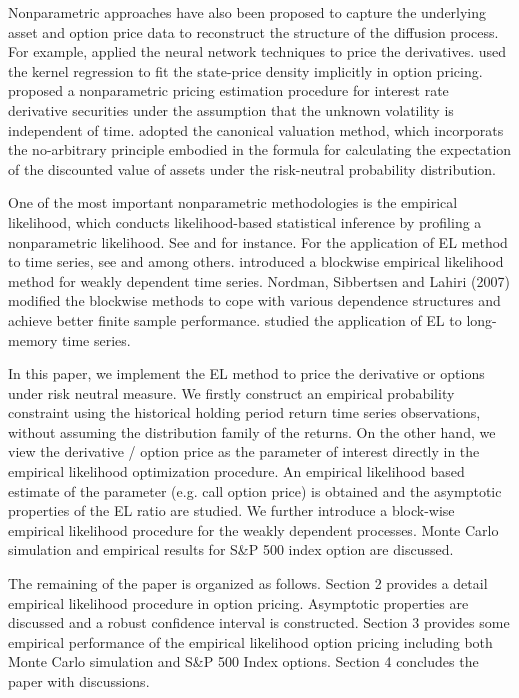 Nonparametric approaches have also been proposed to capture the underlying
asset and option price data to reconstruct the structure of the diffusion
process. For example, \citet{hutchinson1994nonparametric} applied the
neural network techniques to price the derivatives. \citet{ait1998nonparametric} used the kernel regression to fit the state-price density
implicitly in option pricing. \citet{ait1996nonparametric} proposed a nonparametric
pricing estimation procedure for interest rate derivative securities
under the assumption that the unknown volatility is independent of
time. \citet{stutzer1996simple} adopted the canonical valuation method, which
incorporats the no-arbitrary principle embodied in the formula for
calculating the expectation of the discounted value of assets under
the risk-neutral probability distribution. %


One of the most important nonparametric methodologies is the empirical likelihood, which conducts likelihood-based statistical inference by profiling a nonparametric likelihood. See \citet{owen1988empirical,owen1990empirical,owen2010empirical,diciccio1989adjustments} and \citet{hall1990methodology} for instance. For the application of EL method to time series, see \citet{mykland1995dual,chuang2002empirical} and \citet{chan2006empirical} among others.  \citet{kitamura1997empirica} introduced a blockwise empirical likelihood method for weakly dependent time series. Nordman, Sibbertsen and Lahiri (2007) modified the blockwise methods to cope with various dependence structures and achieve better finite sample performance. \citet{yau2012empirical} studied the application of EL to long-memory time series. 

In this paper, we implement the EL method to price the derivative or options under risk neutral measure. We firstly construct an empirical probability constraint using the historical holding period return time series observations, without assuming the distribution family of the returns. On the other hand, we view the derivative / option price as the parameter of interest directly in the empirical likelihood optimization procedure. An empirical likelihood based estimate of the parameter (e.g. call option price) is obtained and the asymptotic properties of the EL ratio are studied. We further introduce a block-wise empirical likelihood procedure for the weakly dependent processes. Monte Carlo simulation and empirical results for S\&P 500 index option are discussed.     

The remaining of the paper is organized as follows. Section 2 provides a detail empirical likelihood procedure in option pricing. Asymptotic properties are discussed and a robust confidence interval is constructed. Section 3 provides some empirical performance of the empirical likelihood option pricing including both Monte Carlo simulation and S\&P 500 Index options. Section 4 concludes the paper with discussions.

